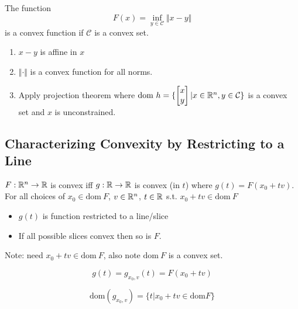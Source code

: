 \begin{example}
The function
\begin{equation*}
F(x) = \inf_{y\in\mathcal{C}}\Vert x-y\Vert
\end{equation*}
is a convex function if $\mathcal{C}$ is a convex set. 

\begin{enumerate}
	\item $x-y$ is affine in $x$
	
	\item $\Vert\cdot\Vert$ is a convex function for all norms.
	
	\item Apply projection theorem where $\text{dom}\ h = \{\begin{bmatrix}
	x\\
	y
	\end{bmatrix}\vert x\in \mathbb{R}^n, y\in \mathcal{C} \}$ is a convex set and $x$ is unconstrained. 
\end{enumerate}
\end{example}


\subsection{Characterizing Convexity by Restricting to a Line}

\begin{theorem} $F: \mathbb{R}^n \rightarrow \mathbb{R}$ is convex iff $g:\mathbb{R} \rightarrow \mathbb{R}$ is convex (in $t$) where $g(t) =F(x_0 + tv)$. For all choices of $x_0\in \text{dom}\ F$, $v\in \mathbb{R}^n$, $t\in \mathbb{R}$ s.t. $x_0+tv\in \text{dom}\ F$
\end{theorem}
\begin{itemize}
	\item $g(t)$ is function restricted to a line/slice
	
	\item If all possible slices convex then so is $F$.
\end{itemize}

Note: need $x_0+tv\in \text{dom}\ F$, also note $\text{dom}\ F$ is a convex set. 

\begin{equation*}
g(t) = g_{x_0, v}(t) = F(x_0+tv)
\end{equation*}

\begin{equation*}
\text{dom}(g_{x_0, v}) = \{t|x_0+tv \in \text{dom}F \}
\end{equation*}

